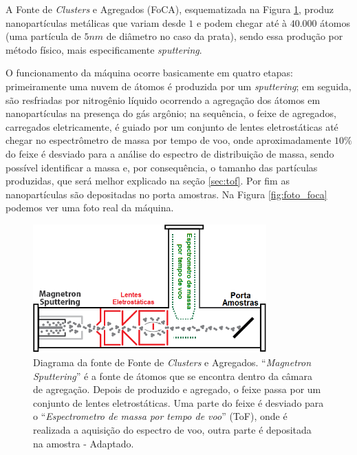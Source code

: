 

A Fonte de \textit{Clusters} e Agregados (FoCA), esquematizada na Figura \ref{fig:esquema_foca}, produz nanopartículas metálicas que variam desde $1$ e podem chegar até à $40.000$ átomos (uma partícula de $5nm$ de diâmetro no caso da prata), sendo essa produção por método físico, mais especificamente \textit{sputtering}.

O funcionamento da máquina ocorre basicamente em quatro etapas: primeiramente uma nuvem de átomos é produzida por um \textit{sputtering}; em seguida, são resfriadas por nitrogênio líquido ocorrendo a agregação dos átomos em nanopartículas na presença do gás argônio; na sequência, o feixe de agregados, carregados eletricamente, é guiado por um conjunto de lentes eletrostáticas até chegar no espectrômetro de massa por tempo de voo, onde aproximadamente $10\%$ do feixe é desviado para a análise do espectro de distribuição de massa, sendo possível identificar a massa e, por consequência, o tamanho das partículas produzidas, que será melhor explicado na seção \ref{sec:tof}. Por fim as nanopartículas são depositadas no porta amostras. Na Figura \ref{fig:foto_foca} podemos ver uma foto real da máquina. 

\begin{figure}
  \centering
  \includegraphics[width=0.8\textwidth]{images/foca/esquematico_foca_pt}
  \caption{ Diagrama da fonte de Fonte de \textit{Clusters} e Agregados. ``\textit{Magnetron Sputtering}'' é a fonte de átomos que se encontra dentro da câmara de agregação. Depois de produzido e agregado, o feixe passa por um conjunto de lentes eletrostáticas. Uma parte do feixe é desviado para o ``\textit{Espectrometro de massa por tempo de voo}'' (ToF), onde é realizada a aquisição do espectro de voo, outra parte é depositada na amostra - Adaptado\cite{livro_vitor}.  }
  \label{fig:esquema_foca}
\end{figure}

